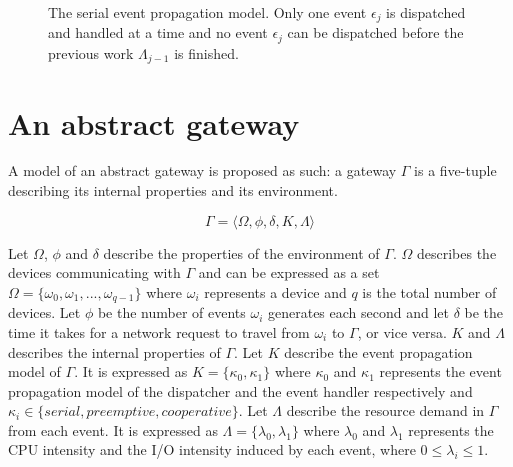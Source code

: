 \begin{figure}[h!]
    \caption{The serial event propagation model. Only one event $\epsilon_j$ is
    dispatched and handled at a time and no event $\epsilon_j$ can be
    dispatched before the previous work $\Lambda_{j-1}$ is finished.}
    \label{fig:event-propagation-serial}
\end{figure}

\section{An abstract gateway}

A model of an abstract gateway is proposed as such: a gateway $\Gamma$ is a
five-tuple describing its internal properties and its environment.

\begin{equation}
\Gamma = \big \langle \Omega, \phi, \delta, K, \Lambda \big \rangle
\end{equation}

Let $\Omega$, $\phi$ and $\delta$ describe the properties of the environment of
$\Gamma$. $\Omega$ describes the devices communicating with $\Gamma$ and can be
expressed as a set $\Omega = \{ \omega_0, \omega_1, ..., \omega_{q-1} \}$ where
$\omega_i$ represents a device and $q$ is the total number of devices. Let
$\phi$ be the number of events $\omega_i$ generates each second and let
$\delta$ be the time it takes for a network request to travel from $\omega_i$
to $\Gamma$, or vice versa. $K$ and $\Lambda$ describes the internal properties
of $\Gamma$. Let $K$ describe the event propagation model of $\Gamma$. It is
expressed as $K = \{ \kappa_0, \kappa_1 \}$ where $\kappa_0$ and $\kappa_1$
represents the event propagation model of the dispatcher and the event handler
respectively and $\kappa_i \in \{ \textit{serial}, \textit{preemptive},
\textit{cooperative} \}$. Let $\Lambda$ describe the resource demand in
$\Gamma$ from each event. It is expressed as $\Lambda = \{ \lambda_0, \lambda_1
\}$ where $\lambda_0$ and $\lambda_1$ represents the CPU intensity and the I/O
intensity induced by each event, where $0 \leq \lambda_i \leq 1$.

